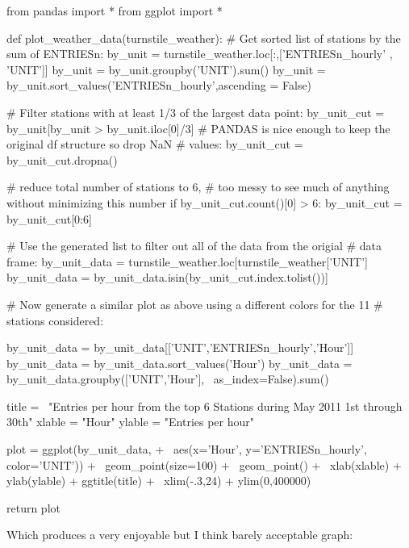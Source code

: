 \documentclass{article}
\numberwithin{questionCtr}{section}
\numberwithin{problemCtr}{section}
\begin{document}
\begin{mdframed}[linecolor=black, topline=true, bottomline=true,
  leftline=false, rightline=false]
\footnotesize
\begin{python1}
from pandas import *
from ggplot import *

def plot_weather_data(turnstile_weather):
    # Get sorted list of stations by the sum of ENTRIESn: 
    by_unit = turnstile_weather.loc[:,['ENTRIESn_hourly' , 'UNIT']]
    by_unit = by_unit.groupby('UNIT').sum()
    by_unit = by_unit.sort_values('ENTRIESn_hourly',ascending = False)

    # Filter stations with at least 1/3 of the largest data point:
    by_unit_cut = by_unit[by_unit > by_unit.iloc[0]/3]
    # PANDAS is nice enough to keep the original df structure so drop NaN
    # values:
    by_unit_cut = by_unit_cut.dropna()

    # reduce total number of stations to 6, 
    # too messy to see much of anything without minimizing this number
    if by_unit_cut.count()[0] > 6: 
        by_unit_cut = by_unit_cut[0:6]

    # Use the generated list to filter out all of the data from the origial
    # data frame:    
    by_unit_data = turnstile_weather.loc[turnstile_weather['UNIT']
    by_unit_data = by_unit_data.isin(by_unit_cut.index.tolist())]

    # Now generate a similar plot as above using a different colors for the 11 
    # stations considered:

    by_unit_data = by_unit_data[['UNIT','ENTRIESn_hourly','Hour']]
    by_unit_data = by_unit_data.sort_values('Hour')
    by_unit_data = by_unit_data.groupby(['UNIT','Hour'], \
        as_index=False).sum()
    
    title = \
    "Entries per hour from the top 6 Stations during May 2011 1st through 30th"
    xlable = "Hour"
    ylable = "Entries per hour"

    plot = ggplot(by_unit_data, + \
        aes(x='Hour', y='ENTRIESn_hourly', color='UNIT')) + \
        geom_point(size=100) + \
        geom_point() + \
        xlab(xlable) + ylab(ylable) + ggtitle(title) + \
        xlim(-.3,24) + ylim(0,400000)

    return plot
\end{python1}
\end{mdframed}

Which produces a very enjoyable but I think barely acceptable graph:
\end{document}
